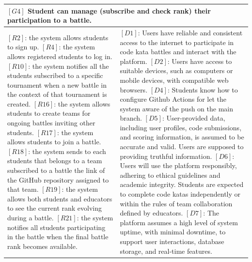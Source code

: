 \begin{table}[H]
    \centering
\begin{tabular}{|p{8cm}|p{8cm}|}
  \hline
  \multicolumn{2}{|p{16cm}|}{\textbf{$[G4]$ Student can manage (subscribe and check rank) their participation to a battle.}} \\
  \hline
  {
  $[R2]$: the system allows students to sign up.
  \newline$[R4]$: the system allows registered students to log in.
  \newline$[R10]$: the system notifies all the students subscribed to a specific tournament when a new battle in the context of that tournament is created.
  \newline$[R16]$: the system allows students to create teams for ongoing battles inviting other students.
  \newline$[R17]$: the system allows students to join a battle.
  \newline$[R18]$: the system sends to each students that belongs to a team subscribed to a battle the link of the GitHub repository assigned to that team.
  \newline$[R19]$: the system allows both students and educators to see the current rank evolving during a battle.
  \newline$[R21]$: the system notifies all students participating in the battle when the final battle rank becomes available.
  }
  & 
  {
  $[D1]$: Users have reliable and consistent access to the internet to participate in code kata battles and interact with the platform.
  \newline$[D2]$: Users have access to suitable devices, such as computers or mobile devices, with compatible web browsers.
  \newline$[D4]$: Students know how to configure Github Actions for let the system aware of the push on the main branch.
  \newline$[D5]$: User-provided data, including user profiles, code submissions, and scoring information, is assumed to be accurate and valid. Users are supposed to providing truthful information.
  \newline$[D6]$: Users will use the platform responsibly, adhering to ethical guidelines and academic integrity. Students are expected to complete code katas independently or within the rules of team collaboration defined by educators.
  \newline$[D7]$: The platform assumes a high level of system uptime, with minimal downtime, to support user interactions, database storage, and real-time features.
}
\end{tabular}
\end{table}

